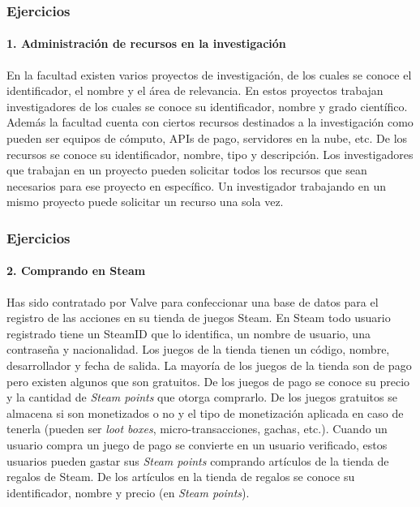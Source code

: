 \begin{frame}
    \frametitle{Ejercicios}
    \framesubtitle<2>{1. Administraci\'on de recursos en la investigaci\'on}

    \pause
    En la facultad existen varios proyectos de investigaci\'on, de los cuales se conoce el identificador, el nombre y el \'area de relevancia. En estos proyectos trabajan investigadores de los cuales se conoce su identificador, nombre y grado cient\'ifico. Adem\'as la facultad cuenta con ciertos recursos destinados a la investigaci\'on como pueden ser equipos de c\'omputo, APIs de pago, servidores en la nube, etc. De los recursos se conoce su identificador, nombre, tipo y descripci\'on. Los investigadores que trabajan en un proyecto pueden solicitar todos los recursos que sean necesarios para ese proyecto en espec\'ifico. Un investigador trabajando en un mismo proyecto puede solicitar un recurso una sola vez.

\end{frame}

\begin{frame}
    \frametitle{Ejercicios}
    \framesubtitle{2. Comprando en Steam}

    Has sido contratado por Valve para confeccionar una base de datos para el registro de las acciones en su tienda de juegos Steam. En Steam todo usuario registrado tiene un SteamID que lo identifica, un nombre de usuario, una contrase\~na y nacionalidad. Los juegos de la tienda tienen un c\'odigo, nombre, desarrollador y fecha de salida. La mayor\'ia de los juegos de la tienda son de pago pero existen algunos que son gratuitos. De los juegos de pago se conoce su precio y la cantidad de \textit{Steam points} que otorga comprarlo. De los juegos gratuitos se almacena si son monetizados o no y el tipo de monetizaci\'on aplicada en caso de tenerla (pueden ser \textit{loot boxes}, micro-transacciones, gachas, etc.). Cuando un usuario compra un juego de pago se convierte en un usuario verificado, estos usuarios pueden gastar sus \textit{Steam points} comprando art\'iculos de la tienda de regalos de Steam. De los art\'iculos en la tienda de regalos se conoce su identificador, nombre y precio (en \textit{Steam points}).

\end{frame}

